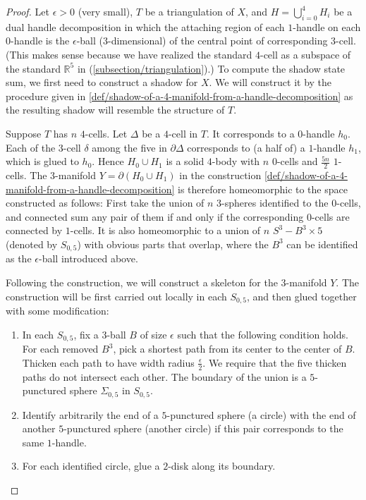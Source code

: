 \begin{proof}
  Let $\epsilon > 0$ (very small), $T$ be a triangulation of $X$,
  and $H = \bigcup_{i=0}^{4} H_{i}$ be a dual handle
  decomposition in which the attaching region of each $1$-handle
  on each $0$-handle is the $\epsilon$-ball ($3$-dimensional) of
  the central point of corresponding $3$-cell. (This makes sense
  because we have realized the standard $4$-cell as a subspace of
  the standard $\mathbb{R}^{5}$ in
  (\ref{subsection/triangulation}).) To compute the shadow state
  sum, we first need to construct a shadow for $X$. We will
  construct it by the procedure given in
  \ref{def/shadow-of-a-4-manifold-from-a-handle-decomposition} as
  the resulting shadow will resemble the structure of $T$.

  Suppose $T$ has $n$ $4$-cells. Let $\Delta$ be a $4$-cell in
  $T$. It corresponds to a $0$-handle $h_{0}$. Each of the
  $3$-cell $\delta$ among the five in $\partial \Delta$
  corresponds to (a half of) a $1$-handle $h_{1}$, which is glued
  to $h_{0}$. Hence $H_{0} \cup H_{1}$ is a solid $4$-body with
  $n$ $0$-cells and $\frac{5n}{2}$ $1$-cells. The $3$-manifold
  $Y = \partial(H_{0} \cup H_{1})$ in the
  construction \ref{def/shadow-of-a-4-manifold-from-a-handle-decomposition}
  is therefore homeomorphic to the space constructed as follows:
  First take the union of $n$ $3$-spheres identified to the
  $0$-cells, and connected sum any pair of them if and only if
  the corresponding $0$-cells are connected by $1$-cells. It is
  also homeomorphic to a union of $n$ $S^{3} - B^{3} \times 5$
  (denoted by $S_{0,5}$) with obvious parts that overlap, where
  the $B^{3}$ can be identified as the $\epsilon$-ball introduced
  above.

  Following the construction, we will construct a skeleton for
  the $3$-manifold $Y$. The construction will be first carried
  out locally in each $S_{0,5}$, and then glued together with
  some modification:

  \begin{enumerate}
    \item In each $S_{0,5}$, fix a $3$-ball $B$ of size
          $\epsilon$ such that the following condition holds. For
          each removed $B^{3}$, pick a shortest path from its
          center to the center of $B$. Thicken each path to have
          width radius $\frac{\epsilon}{2}$. We require that the
          five thicken paths do not intersect each other. The
          boundary of the union is a $5$-punctured sphere
          $\Sigma_{0,5}$ in $S_{0,5}$.
    \item Identify arbitrarily the end of a $5$-punctured sphere
          (a circle) with the end of another $5$-punctured sphere
          (another circle) if this pair corresponds to the same
          $1$-handle.
    \item For each identified circle, glue a $2$-disk along its
          boundary.
  \end{enumerate}


\end{proof}
